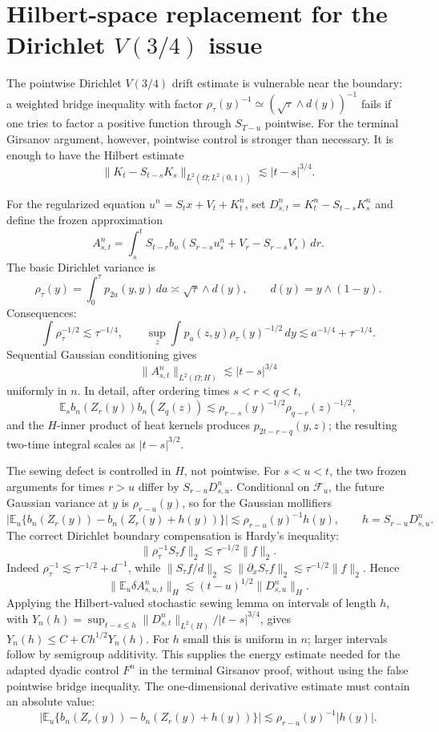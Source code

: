 \documentclass[12pt]{article}
\newcommand{\E}{\mathbb E}
\begin{document}
\section*{Hilbert-space replacement for the Dirichlet \(V(3/4)\) issue}

The pointwise Dirichlet \(V(3/4)\) drift estimate is vulnerable near the
boundary: a weighted bridge inequality with factor
\(\rho_\tau(y)^{-1}\simeq(\sqrt{\tau}\wedge d(y))^{-1}\) fails if one tries to
factor a positive function through \(S_{T-u}\) pointwise.  For the terminal
Girsanov argument, however, pointwise control is stronger than necessary.  It
is enough to have the Hilbert estimate
\[
 \|K_t-S_{t-s}K_s\|_{L^2(\Omega;L^2(0,1))}
       \lesssim |t-s|^{3/4}.
\]

For the regularized equation \(u^n=S_tx+V_t+K_t^n\), set
\(D^n_{s,t}=K_t^n-S_{t-s}K_s^n\) and define the frozen approximation
\[
 A^n_{s,t}=\int_s^t S_{t-r}b_n(S_{r-s}u_s^n+V_r-S_{r-s}V_s)\,dr .
\]
The basic Dirichlet variance is
\[
 \rho_\tau(y)=\int_0^\tau p_{2a}(y,y)\,da
   \asymp \sqrt{\tau}\wedge d(y),\qquad d(y)=y\wedge(1-y).
\]
Consequences:
\[
 \int \rho_\tau^{-1/2}\lesssim \tau^{-1/4},\qquad
 \sup_z\int p_a(z,y)\rho_\tau(y)^{-1/2}\,dy
       \lesssim a^{-1/4}+\tau^{-1/4}.
\]
Sequential Gaussian conditioning gives
\[
 \|A^n_{s,t}\|_{L^2(\Omega;H)}\lesssim |t-s|^{3/4}
\]
uniformly in \(n\).  In detail, after ordering times \(s<r<q<t\),
\[
\E_s b_n(Z_r(y))b_n(Z_q(z))
 \lesssim \rho_{r-s}(y)^{-1/2}\rho_{q-r}(z)^{-1/2},
\]
and the \(H\)-inner product of heat kernels produces
\(p_{2t-r-q}(y,z)\); the resulting two-time integral scales as
\(|t-s|^{3/2}\).

The sewing defect is controlled in \(H\), not pointwise.  For \(s<u<t\),
the two frozen arguments for times \(r>u\) differ by \(S_{r-u}D^n_{s,u}\).
Conditional on \(\mathcal F_u\), the future Gaussian variance at \(y\) is
\(\rho_{r-u}(y)\), so for the Gaussian mollifiers
\[
 \left|\E_u\{b_n(Z_r(y))-b_n(Z_r(y)+h(y))\}\right|
   \lesssim \rho_{r-u}(y)^{-1}h(y),\qquad h=S_{r-u}D^n_{s,u}.
\]
The correct Dirichlet boundary compensation is Hardy's inequality:
\[
 \|\rho_\tau^{-1}S_\tau f\|_{2}
 \lesssim \tau^{-1/2}\|f\|_2.
\]
Indeed \(\rho_\tau^{-1}\lesssim \tau^{-1/2}+d^{-1}\), while
\(\|S_\tau f/d\|_2\lesssim\|\partial_xS_\tau f\|_2
 \lesssim \tau^{-1/2}\|f\|_2\).  Hence
\[
 \|\E_u\delta A^n_{s,u,t}\|_H
   \lesssim (t-u)^{1/2}\|D^n_{s,u}\|_H.
\]
Applying the Hilbert-valued stochastic sewing lemma on intervals of length
\(h\), with
\(Y_n(h)=\sup_{t-s\le h}\|D^n_{s,t}\|_{L^2(H)}/|t-s|^{3/4}\), gives
\(Y_n(h)\le C+C h^{1/2}Y_n(h)\).  For \(h\) small this is uniform in \(n\);
larger intervals follow by semigroup additivity.  This supplies the energy
estimate needed for the adapted dyadic control \(F^n\) in the terminal
Girsanov proof, without using the false pointwise bridge inequality.  The
one-dimensional derivative estimate must contain an absolute value:
\[
 \left|\E_u\{b_n(Z_r(y))-b_n(Z_r(y)+h(y))\}\right|
   \lesssim \rho_{r-u}(y)^{-1}|h(y)| .
\]
\end{document}
